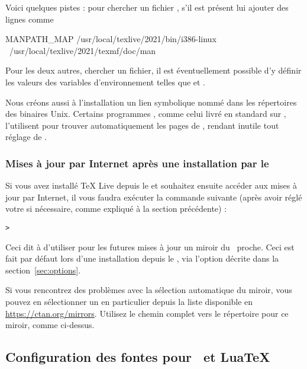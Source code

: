 \documentclass[german, english, french]{article}
\renewcommand{\TL}{\TeX{} Live\xspace}%
\begin{document}
Voici quelques pistes : pour  chercher un fichier
, s'il est présent lui ajouter des lignes comme
\begin{sverbatim}
MANPATH_MAP /usr/local/texlive/2021/bin/i386-linux \
            /usr/local/texlive/2021/texmf/doc/man
\end{sverbatim}
Pour les deux autres, chercher un fichier, il est
éventuellement possible d'y définir les valeurs des variables d'environnement
telles que \envname{PATH} et \envname{INFOPATH}.

Nous créons aussi à l'installation un lien symbolique nommé  dans les
répertoires des binaires Unix. Certains programmes , comme celui livré
en standard sur \MacOSX{}, l'utilisent pour trouver automatiquement les pages de
\code{man}, rendant inutile tout réglage de \envname{MANPATH}.

\subsubsection{Mises à jour par Internet après une installation par le
  \protect\DVD}
\label{sec:dvd-install-net-updates}

Si vous avez installé \TL{} depuis le \DVD{} et souhaitez ensuite accéder aux
mises à jour par Internet, il vous faudra exécuter la commande suivante (après
avoir réglé votre \envname{PATH} si nécessaire, comme expliqué à la section
précédente) :

\begin{alltt}
> 
\end{alltt}

Ceci dit à  d'utiliser pour les futures mises à jour un miroir du
\CTAN\ proche. Ceci est fait par défaut lors d'une installation depuis le \DVD,
via l'option décrite dans la section~\ref{sec:options}.

Si vous rencontrez des problèmes avec la sélection automatique du miroir, vous
pouvez en sélectionner un en particulier depuis la liste disponible en
\url{https://ctan.org/mirrors}. Utilisez le chemin complet vers le répertoire
\dirname{tlnet} pour ce miroir, comme ci-dessus.


\subsection{Configuration des fontes pour \protect\XeTeX\ et Lua\protect\TeX}
\label{sec:font-conf-sys}
\end{document}
